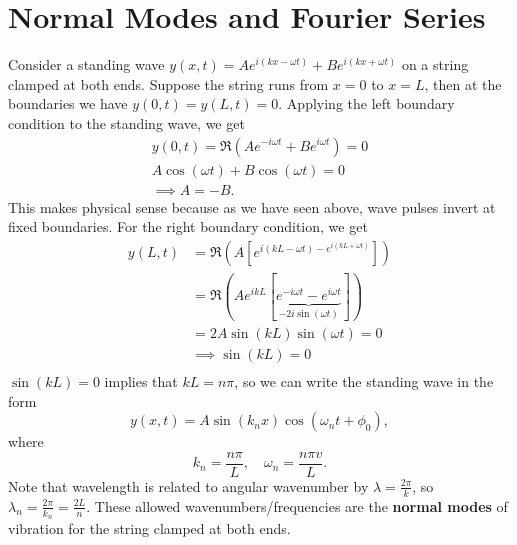 \documentclass[../classical_mechanics.tex]{subfiles}
\begin{document}
    \section{Normal Modes and Fourier Series}\label{sec:normal-modes-and-fourier-series}
        Consider a standing wave $y(x,t)=Ae^{i(kx-\omega t)}+Be^{i(kx+\omega t)}$ on a string clamped at both ends.
        Suppose the string runs from $x=0$ to $x=L$, then at the boundaries we have $y(0,t)=y(L,t)=0$.
        Applying the left boundary condition to the standing wave, we get
        \begin{gather}
            y(0,t)=\Re(Ae^{-i\omega t}+Be^{i\omega t})=0\\
            A\cos(\omega t)+B\cos(\omega t)=0\\
            \implies A=-B.
        \end{gather}
        This makes physical sense because as we have seen above, wave pulses invert at fixed boundaries.
        For the right boundary condition, we get
        \begin{align}
            y(L,t)&=\Re(A[e^{i(kL-\omega t)-e^{i(kL+\omega t)}}])\\
            &=\Re(Ae^{ikL}[\underbrace{e^{-i\omega t}-e^{i\omega t}}_{-2i\sin(\omega t)}])\\
            &=2A\sin(kL)\sin(\omega t)=0\\
            &\implies\sin(kL)=0\\
        \end{align}
        $\sin(kL)=0$ implies that $kL=n\pi$, so we can write the standing wave in the form
        \begin{equation}
            y(x,t)=A\sin(k_n x)\cos(\omega_n t+\phi_0),
        \end{equation}
        where
        \begin{equation}
            k_n=\frac{n\pi}{L},\quad\omega_n=\frac{n\pi v}{L}.
        \end{equation}
        Note that wavelength is related to angular wavenumber by $\lambda=\frac{2\pi}{k}$, so $\lambda_n=\frac{2\pi}{k_n}=\frac{2L}{n}$.
        These allowed wavenumbers/frequencies are the \textbf{normal modes} of vibration for the string clamped at both ends.
\end{document}
